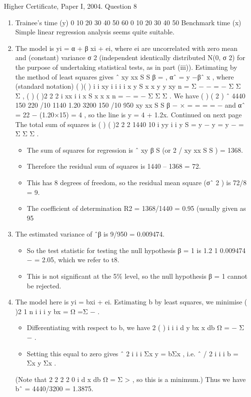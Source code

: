 \documentclass[a4paper,12pt]{article}
\begin{document}
Higher Certificate, Paper I, 2004. Question 8
\begin{enumerate}
\item Trainee's time (y)
0
10
20
30
40
50
60
0 10 20 30 40 50
Benchmark time (x)
Simple linear regression analysis seems quite suitable.
\item  The model is yi = α + β xi + ei, where {ei} are uncorrelated with zero mean and
(constant) variance σ 2 (independent identically distributed N(0, σ 2) for the purpose of
undertaking statistical tests, as in part (iii)). Estimating by the method of least squares
gives
ˆ xy
xx
S
S
β = , αˆ = y −βˆ x ,
where (standard notation)
( )( ) i i
xy i i i i
x y
S x x y y xy
n
= Σ − − = − Σ Σ Σ ,
( ) ( )2
2 2 i
xx i i
x
S x x x
n
= − = − Σ Σ Σ .
We have
( )
( 2 )
ˆ 4440 150 220 /10 1140 1.20
3200 150 /10 950
xy
xx
S
S
β
− ×
= = = =
−
and αˆ = 22 − (1.20×15) = 4 ,
so the line is
y = 4 + 1.2x.
Continued on next page
The total sum of squares is ( ) ( )2
2 2 1440
10
i
yy i i
y
S = y − y = y − = Σ Σ Σ .
\begin{itemize}
\item The sum of squares for regression is ˆ
xy β S (or 2 / xy xx S S ) = 1368.
\item Therefore the residual sum of squares is 1440 – 1368 = 72.
\item This has 8 degrees of freedom, so the residual mean square (σˆ 2 ) is 72/8 = 9.
\item The coefficient of determination R2 = 1368/1440 = 0.95 (usually given as 95%
\end{itemize}

\item  The estimated variance of ˆβ is 9/950 = 0.009474. 
\begin{itemize}
    \item So the test statistic for
testing the null hypothesis β = 1 is 1.2 1
0.009474
− = 2.05, which we refer to t8.
\item This is not significant at the 5\% level, so the null hypothesis β = 1 cannot be rejected.
\end{itemize}

\item  The model here is yi = bxi + ei.
Estimating b by least squares, we minimise ( )2
1
n
i i
i
y bx
=
Ω =Σ − .
\begin{itemize}
    \item Differentiating with respect to b, we have 2 ( ) i i i
d y bx x
db
Ω = − Σ − .
\item Setting this equal to zero gives ˆ 2
i i i Σx y = bΣx , i.e. ˆ / 2 i i i b = Σx y Σx .
\end{itemize}

(Note that
2
2
2 2 0 i
d x
db
Ω = Σ > , so this is a minimum.)
Thus we have bˆ = 4440/3200 = 1.3875.
\end{enumerate}
\end{document}
